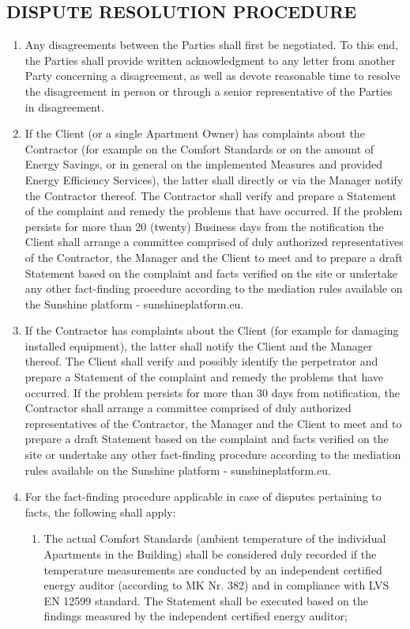 \begin{multicols}{2}
\subsection{DISPUTE RESOLUTION PROCEDURE}
\begin{enumerate}
	\item	Any disagreements between the Parties shall first be negotiated. To this end, the Parties shall provide written acknowledgment to any letter from another Party concerning a disagreement, as well as devote reasonable time to resolve the disagreement in person or through a senior representative of the Parties in disagreement.
	\item	If the Client (or a single Apartment Owner) has complaints about the Contractor (for example on the Comfort Standards or on the amount of Energy Savings, or in general on the implemented Measures and provided Energy Efficiency Services), the latter shall directly or via the Manager notify the Contractor thereof. The Contractor shall verify and prepare a Statement of the complaint and remedy the problems that have occurred. If the problem persists for more than 20 (twenty) Business days from the notification the Client shall arrange a committee comprised of duly authorized representatives of the Contractor, the Manager and the Client to meet and to prepare a draft Statement based on the complaint and facts verified on the site or undertake any other fact-finding procedure according to the mediation rules available on the Sunshine platform - sunshineplatform.eu.
	\item	If the Contractor has complaints about the Client (for example for damaging installed equipment), the latter shall notify the Client and the Manager thereof. The Client shall verify and possibly identify the perpetrator and prepare a Statement of the complaint and remedy the problems that have occurred. If the problem persists for more than 30 days from notification, the Contractor shall arrange a committee comprised of duly authorized representatives of the Contractor, the Manager and the Client to meet and to prepare a draft Statement based on the complaint and facts verified on the site or undertake any other fact-finding procedure according to the mediation rules available on the Sunshine platform - sunshineplatform.eu.
	\item	For the fact-finding procedure applicable in case of disputes pertaining to facts, the following shall apply:
	\begin{enumerate}
		\item	The actual Comfort Standards (ambient temperature of the individual Apartments in the Building) shall be considered duly recorded if the temperature measurements are conducted by an independent certified energy auditor (according to MK Nr. 382) and in compliance with LVS EN 12599 standard. The Statement shall be executed based on the findings measured by the independent certified energy auditor;

\end{enumerate}
\end{enumerate}
\end{multicols}
